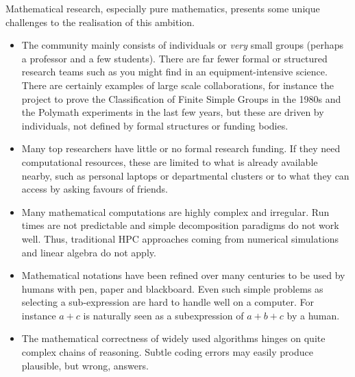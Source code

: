 Mathematical research, especially pure mathematics, presents some
unique challenges to the realisation of this ambition.


\begin{itemize}
\item The community mainly consists of individuals or \textit{very} small
  groups (perhaps a professor and a few students). There are far fewer formal or structured research
  teams such as you might find in an equipment-intensive science. There are 
  certainly examples of large scale collaborations, for instance the
  project to prove the Classification of Finite Simple Groups in the
  1980s and the Polymath experiments in the last few years,
  but these are driven by individuals, not defined by formal structures or funding bodies.
\item Many top researchers have little or no formal research
  funding. If they need computational resources, these are limited to what 
  is already available nearby, such as personal laptops or
  departmental clusters or to what they can access by asking favours
  of friends.
\item Many mathematical computations are highly complex and irregular.
  Run times are not predictable and simple decomposition paradigms do
  not work well. Thus,
  traditional HPC approaches coming from numerical simulations and linear algebra do not apply.
\item Mathematical notations have been refined over many centuries to be
  used by humans with pen, paper and blackboard. Even such simple
  problems as selecting a sub-expression are hard to handle well on a
  computer. For instance $a+c$ is naturally seen as a subexpression of
  $a+b+c$ by a human.
\item The mathematical correctness of widely used algorithms hinges on
  quite complex chains of reasoning. Subtle coding errors may easily
  produce plausible, but wrong, answers.


\end{itemize}
